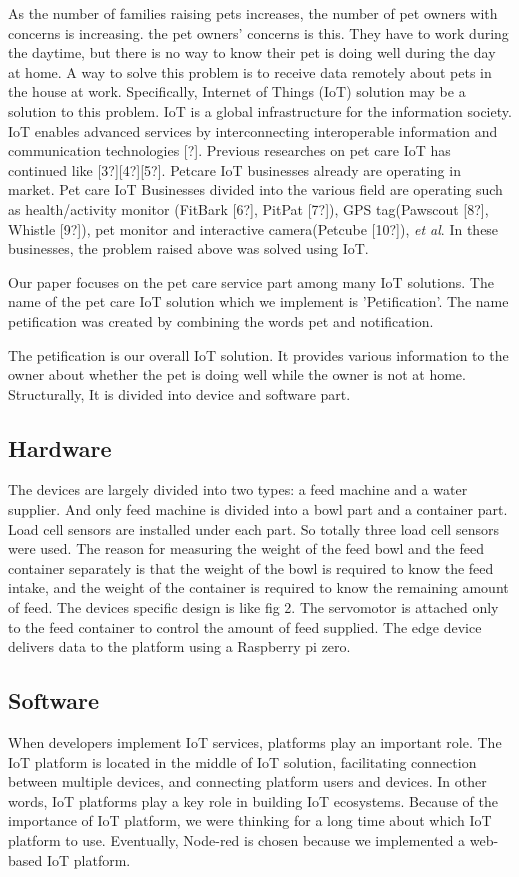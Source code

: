 \documentclass[conference]{IEEEtran}
\begin{document}
 As the number of families raising pets increases, the number of pet owners with concerns is increasing. the pet owners' concerns is this. They have to work during the daytime, but there is no way to know their pet is doing well during the day at home.
A way to solve this problem is to receive data remotely about pets in the house at work. Specifically, Internet of Things (IoT) solution may be a solution to this problem.
IoT is a global infrastructure for the information society. IoT enables advanced services by interconnecting interoperable information and communication technologies [?].
Previous researches on pet care IoT has continued like [3?][4?][5?]. Petcare IoT businesses already are operating in market. Pet care IoT Businesses divided into the various field are operating such as health/activity monitor (FitBark [6?], PitPat [7?]), GPS tag(Pawscout [8?], Whistle [9?]),
pet monitor and interactive camera(Petcube [10?]), \textit{et al}. In these businesses, the problem raised above was solved using IoT.

 Our paper focuses on the pet care service part among many IoT solutions. The name of the pet care IoT solution which we implement is 'Petification'. The name petification was created by combining the words pet and notification.
 
 The petification is our overall IoT solution. It provides various information to the owner about whether the pet is doing well while the owner is not at home. Structurally, It is divided into device and software part.   
\subsection{Hardware}
The devices are largely divided into two types: a feed machine and a water supplier. And only feed machine is divided into a bowl part and a container part. Load cell sensors are installed under each part. So totally three load cell sensors were used. The reason for measuring the weight of the feed bowl and the feed container separately is that the weight of the bowl is required to know the feed intake, and the weight of the container is required to know the remaining amount of feed. The devices specific design is like fig 2. The servomotor is attached only to the feed container to control the amount of feed supplied. The edge device delivers data to the platform using a Raspberry pi zero.

\subsection{Software}
When developers implement IoT services, platforms play an important role. The IoT platform is located in the middle of IoT solution, facilitating connection between multiple devices, and connecting platform users and devices. In other words, IoT platforms play a key role in building IoT ecosystems. Because of the importance of IoT platform, we were thinking for a long time about which IoT platform to use. Eventually, Node-red is chosen because we implemented a web-based IoT platform. 
\end{document}
